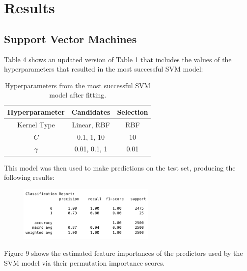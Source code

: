 \documentclass[11pt, oneside]{article}   	%
\begin{document}
\section{Results}



\subsection{Support Vector Machines}

Table 4 shows an updated version of Table 1 that includes the values of the hyperparameters that resulted in the most successful SVM model:

\begin{table}[h!]
	\centering
    	\begin{tabular}{|c|c|c|}	
		\hline
		\textbf{Hyperparameter} & \textbf{Candidates} & \textbf{Selection} \\ \hline
		Kernel Type & Linear, RBF & RBF \\ \hline
		$C$  & 0.1, 1, 10 & 10 \\ \hline
		$\gamma$ & 0.01, 0.1, 1 & 0.01 \\ \hline
	\end{tabular}
	\caption{Hyperparameters from the most successful SVM model after fitting.}
	\label{tab4}
\end{table}

This model was then used to make predictions on the test set, producing the following results:

\begin{figure}[h!]
	\centering
	\includegraphics[width=0.6\textwidth]{figures/svm_results.png}
\end{figure}

Figure 9 shows the estimated feature importances of the predictors used by the SVM model via their permutation importance scores.
\end{document}
